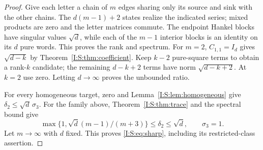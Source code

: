 \begin{proof}
Give each letter a chain of $m$ edges sharing only its source and sink with the other chains. The $d(m-1)+2$ states realize the indicated series; mixed products are zero and the letter matrices commute. The endpoint Hankel blocks have singular values $\sqrt d$, while each of the $m-1$ interior blocks is an identity on its $d$ pure words. This proves the rank and spectrum. For $m=2$, $C_{1,1}=I_d$ gives $\sqrt{d-k}$ by Theorem~\ref{I:S:thm:coefficient}. Keep $k-2$ pure-square terms to obtain a rank-$k$ candidate; the remaining $d-k+2$ terms have norm $\sqrt{d-k+2}$. At $k=2$ use zero. Letting $d\to\infty$ proves the unbounded ratio.

For every homogeneous target, zero and Lemma~\ref{I:S:lem:homogeneous} give $\delta_2\le\sqrt d\,\sigma_3$. For the family above, Theorem~\ref{I:S:thm:trace} and the spectral bound give
\[
 \max\{1,\sqrt d(m-1)/(m+3)\}\le\delta_2\le\sqrt d,
 \qquad\sigma_3=1.
\]
Let $m\to\infty$ with $d$ fixed. This proves \eqref{I:S:eq:sharp}, including its restricted-class assertion.
\end{proof}

